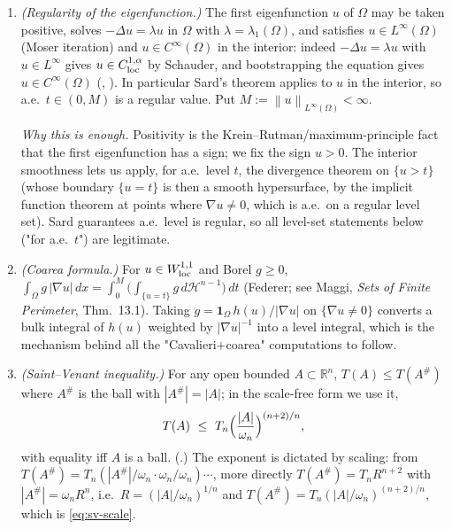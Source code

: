 \documentclass[11pt]{amsart}
\theoremstyle{definition}
\newcommand{\R}{\mathbb R}
\newcommand{\Om}{\Omega}
\newcommand{\abs}[1]{\left|#1\right|}
\newcommand{\norm}[1]{\left\|#1\right\|}
\newcommand{\dx}{\,dx}
\newcommand{\dt}{\,dt}
\newcommand{\dH}{\,d\mathcal H^{n-1}}
\begin{document}
\begin{enumerate}[label=\textup{(R\arabic*)}]
\item\label{R:reg} \emph{(Regularity of the eigenfunction.)} The first
eigenfunction $u$ of $\Om$ may be taken positive, solves
$-\Delta u=\lambda u$ in $\Om$ with $\lambda=\lambda_1(\Om)$, and satisfies
$u\in L^\infty(\Om)$ (Moser iteration) and $u\in C^\infty(\Om)$ in the
interior: indeed $-\Delta u=\lambda u$ with $u\in L^\infty$ gives $u\in
C^{1,\alpha}_{\rm loc}$ by Schauder, and bootstrapping the equation gives
$u\in C^\infty(\Om)$ (\cite[Prop.~2.4]{Brasco2014}, \cite{GilbargTrudinger2001}).
In particular Sard's theorem applies to $u$ in the interior, so a.e.\
$t\in(0,M)$ is a regular value. Put $M:=\norm{u}_{L^\infty(\Om)}<\infty$.

\emph{Why this is enough.} Positivity is the Krein--Rutman/maximum-principle
fact that the first eigenfunction has a sign; we fix the sign $u>0$. The
interior smoothness lets us apply, for a.e.\ level $t$, the divergence
theorem on $\{u>t\}$ (whose boundary $\{u=t\}$ is then a smooth
hypersurface, by the implicit function theorem at points where
$\nabla u\ne0$, which is a.e.\ on a regular level set). Sard guarantees
a.e.\ level is regular, so all level-set statements below ("for a.e.\ $t$")
are legitimate.

\item\label{R:coarea} \emph{(Coarea formula.)} For $u\in W^{1,1}_{\rm loc}$
and Borel $g\ge0$,
$\int_\Om g\,\abs{\nabla u}\dx=\int_0^M\bigl(\int_{\{u=t\}}g\dH\bigr)\dt$
(Federer; see Maggi, \emph{Sets of Finite Perimeter}, Thm.~13.1). Taking
$g=\mathbf 1_{\Om}\,h(u)/\abs{\nabla u}$ on $\{\nabla u\ne0\}$ converts a
bulk integral of $h(u)$ weighted by $\abs{\nabla u}^{-1}$ into a level
integral, which is the mechanism behind all the "Cavalieri$+$coarea"
computations to follow.

\item\label{R:saint-venant} \emph{(Saint--Venant inequality.)} For any open
bounded $A\subset\R^n$, $T(A)\le T(A^\#)$ where $A^\#$ is the ball with
$\abs{A^\#}=\abs A$; in the scale-free form we use it,
\begin{equation}\label{eq:sv-scale}
  T(A)\ \le\ T_n\Bigl(\frac{\abs A}{\omega_n}\Bigr)^{(n+2)/n},
\end{equation}
with equality iff $A$ is a ball. (\cite[(1.7) with $p=2$]{Brasco2014}.)
The exponent is dictated by scaling: from $T(A^\#)=T_n(\abs{A^\#}/\omega_n
\cdot\omega_n/\omega_n)\cdots$, more directly $T(A^\#)=T_n R^{n+2}$ with
$\abs{A^\#}=\omega_n R^n$, i.e.\ $R=(\abs A/\omega_n)^{1/n}$ and
$T(A^\#)=T_n(\abs A/\omega_n)^{(n+2)/n}$, which is \eqref{eq:sv-scale}.


\end{enumerate}
\end{document}
